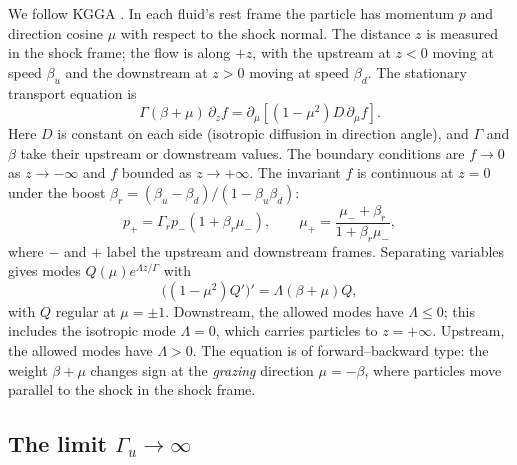 \documentclass[aps,prd,twocolumn,superscriptaddress,nofootinbib,floatfix]{revtex4-2}
\newcommand{\bd}{\beta_d}
\newcommand{\bu}{\beta_u}
\begin{document}
We follow KGGA \cite{KGGA2000}. In each fluid's rest frame the particle has momentum $p$ and direction cosine
$\mu$ with respect to the shock normal. The distance $z$ is measured in the shock frame; the flow is along $+z$,
with the upstream at $z<0$ moving at speed $\bu$ and the downstream at $z>0$ moving at speed $\bd$. The
stationary transport equation is
\begin{equation}
\Gamma(\beta+\mu)\,\partial_z f=\partial_\mu\!\left[(1-\mu^2)D\,\partial_\mu f\right].
\label{eq:transport}
\end{equation}
Here $D$ is constant on each side (isotropic diffusion in direction angle), and $\Gamma$ and $\beta$ take their
upstream or downstream values. The boundary conditions are $f\to0$ as $z\to-\infty$ and $f$ bounded as
$z\to+\infty$. The invariant $f$ is continuous at $z=0$ under the boost
$\beta_r=(\bu-\bd)/(1-\bu\bd)$:
\begin{equation}
p_+=\Gamma_rp_-(1+\beta_r\mu_-),\qquad \mu_+=\frac{\mu_-+\beta_r}{1+\beta_r\mu_-},
\label{eq:boost}
\end{equation}
where $-$ and $+$ label the upstream and downstream frames. Separating variables gives modes
$Q(\mu)e^{\Lambda z/\Gamma}$ with
\begin{equation}
\bigl((1-\mu^2)Q'\bigr)'=\Lambda(\beta+\mu)Q ,
\label{eq:eig}
\end{equation}
with $Q$ regular at $\mu=\pm1$. Downstream, the allowed modes have $\Lambda\le0$; this includes the isotropic
mode $\Lambda=0$, which carries particles to $z=+\infty$. Upstream, the allowed modes have $\Lambda>0$. The
equation is of forward--backward type: the weight $\beta+\mu$ changes sign at the \emph{grazing} direction
$\mu=-\beta$, where particles move parallel to the shock in the shock frame.

\subsection{The limit $\Gamma_u\to\infty$}
\label{sec:limit}
\end{document}
